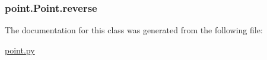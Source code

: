 \subsubsection[{reverse}]{\setlength{\rightskip}{0pt plus 5cm}point.\+Point.\+reverse}\label{classpoint_1_1_point_a999ffad9951028b7456cea0afb407e48}


The documentation for this class was generated from the following file\+:\begin{DoxyCompactItemize}
\item 
\hyperlink{point_8py}{point.\+py}\end{DoxyCompactItemize}
